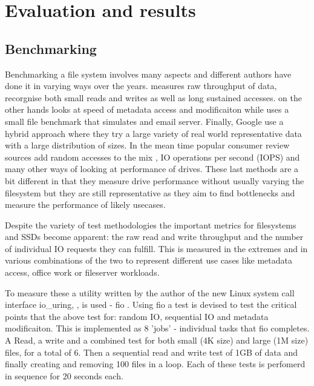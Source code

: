 \chapter{Evaluation and results}

    \section{Benchmarking}
        \label{sec_benchmark}


        Benchmarking a file system involves many aspects and different authors
        have done it in varying ways over the years.  \citeauthor{FFS} measures
        raw throughput of data, \citeauthor{LFS} recorgnise both small reads
        and writes as well as long sustained accesses.
        \citeauthor{soft_updates} on the other hands looks at speed of metadata
        access and modificaiton while \citeauthor{ext4_space_maps} uses a small
        file benchmark that simulates and email server. Finally, Google use a
        hybrid approach where they try a large variety of real world
        representative data with a large distribution of sizes. In the mean
        time popular consumer review sources add random accesses to the mix
        \cite{servethehome_review}, IO operations per second (IOPS)
        \cite{tomshardware_review} and many other ways of looking at
        performance of drives. These last methods are a bit different in that
        they measure drive performance without usually varying the filesystem
        but they are still representative as they aim to find bottlenecks and
        measure the performance of likely usecases.

        Despite the variety of test methodologies the important metrics for
        filesystems and SSDs become apparent: the raw read and write throughput
        and the number of individual IO requests they can fulfill. This is
        measured in the extremes and in various combinations of the two to
        represent different use cases like metadata access, office work or
        fileserver workloads.

        To measure these a utility written by the author of the new Linux
        system call interface io\_uring, \citeauthor{IO_uring}, is used - fio
        \cite{fio}. Using fio a test is devised to test the critical points
        that the above test for: random IO, sequential IO and metadata
        modificaiton. This is implemented as 8 'jobs' - individual tasks that
        fio completes. A Read, a write and a combined test for both small (4K
        size) and large (1M size) files, for a total of 6.  Then a sequential
        read and write test of 1GB of data and finally creating and removing
        100 files in a loop. Each of these tests is perfomerd in sequence for
        20 seconds each.

